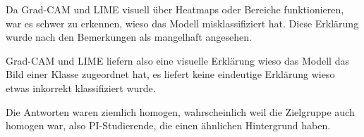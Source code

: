 Da Grad-CAM und LIME visuell über Heatmaps oder Bereiche funktionieren, war es schwer zu erkennen, wieso das Modell misklassifiziert hat. Diese Erklärung wurde nach den Bemerkungen als mangelhaft angesehen.

Grad-CAM und LIME liefern also eine visuelle Erklärung wieso das Modell das Bild einer Klasse zugeordnet hat, es liefert keine eindeutige Erklärung wieso etwas inkorrekt klassifiziert wurde.

Die Antworten waren ziemlich homogen, wahrscheinlich weil die Zielgruppe auch homogen war, also PI-Studierende, die einen ähnlichen Hintergrund haben.